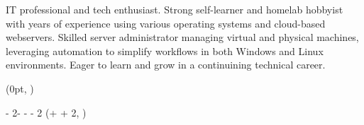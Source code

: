 \documentclass[11pt, a4paper]{resume}
\begin{document}
\makecvheader %

\begin{cvsummary}
  IT professional and tech enthusiast. Strong self-learner and homelab hobbyist with years of experience using various operating systems and cloud-based webservers. Skilled server administrator managing virtual and physical machines, leveraging automation to simplify workflows in both Windows and Linux environments. Eager to learn and grow in a continuining technical career.
\end{cvsummary}



\setlength{\headersmargin}{-0.2cm}
\setlength{\leftcolumnwidth}{5cm}
\setlength{\columnsmargin}{0.5\sidemargin}
\setlength{\timelinemargin}{0.5cm}


\begin{textblock*}{\leftcolumnwidth}(0pt, \headersmargin)
    \vspace{-2mm}
    
    \vspace{3mm}
    
    \vspace{3.5mm}
    
\end{textblock*}

\begin{textblock*}
    {\paperwidth - 2\sidemargin - \leftcolumnwidth - \columnsmargin - 2\timelinemargin}
    (\leftcolumnwidth + \columnsmargin + 2\timelinemargin, \headersmargin)
    \vspace{-2mm}
    
    
\end{textblock*}

\end{document}
